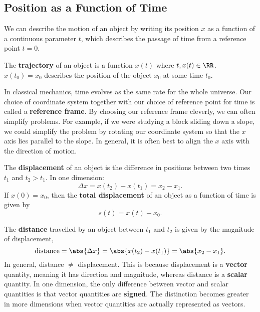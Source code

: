 \documentclass[../classical_mechanics.tex]{subfiles}
\begin{document}
        \subsection{Position as a Function of Time}\label{subsec:position-as-a-function-of-time}
            We can describe the motion of an object by writing its position $x$ as a function of a continuous parameter $t$, which describes the passage of time from a reference point $t=0$.
            \begin{definition}
                The \textbf{trajectory} of an object is a function $x(t)$ where $t,x(t)\in\RR$. $x(t_0)=x_0$ describes the position of the object $x_0$ at some time $t_0$.
            \end{definition}

            In classical mechanics, time evolves as the same rate for the whole universe.
            Our choice of coordinate system together with our choice of reference point for time is called a \textbf{reference frame}.
            By choosing our reference frame cleverly, we can often simplify problems.
            For example, if we were studying a block sliding down a slope, we could simplify the problem by rotating our coordinate system so that the $x$ axis lies parallel to the slope.
            In general, it is often best to align the $x$ axis with the direction of motion.
            \begin{definition}
                The \textbf{displacement} of an object is the difference in positions between two times $t_1$ and $t_2>t_1$. In one dimension:
                \begin{equation}
                    \Delta x=x(t_2)-x(t_1)=x_2-x_1.
                \end{equation}
                If $x(0)=x_0$, then the \textbf{total displacement} of an object as a function of time is given by
                \begin{equation}
                    s(t)=x(t)-x_0.
                \end{equation}
            \end{definition}
            The \textbf{distance} travelled by an object between $t_1$ and $t_2$ is given by the magnitude of displacement,
            \begin{equation}
                \mathrm{distance}=\abs{\Delta x}=\abs{x(t_2)-x(t_1)}=\abs{x_2-x_1}.
            \end{equation}
            In general, distance $\neq$ displacement.
            This is because displacement is a \textbf{vector} quantity, meaning it has direction and magnitude, whereas distance is a \textbf{scalar} quantity.
            In one dimension, the only difference between vector and scalar quantities is that vector quantities are \textbf{signed}.
            The distinction becomes greater in more dimensions when vector quantities are actually represented as vectors.
        
\end{document}
